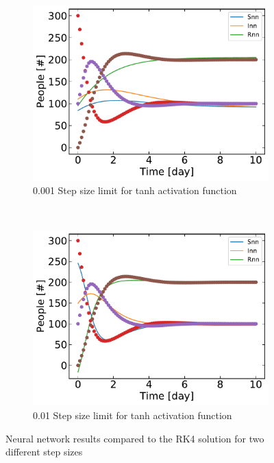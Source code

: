 	 \begin{figure}[H]
	     \centering
	     \begin{subfigure}{0.5\textwidth}
	         \centering
	         \includegraphics[width=\linewidth]{result/Resultater_supervised/tanh_1000_100_001.pdf}
	         \caption{0.001 Step size limit for tanh activation function}
	     \end{subfigure}%
	     ~ 
	     \begin{subfigure}{0.5\textwidth}
	         \centering
	         \includegraphics[width=\linewidth]{result/Resultater_supervised/tanh_1000_100_01.pdf}
	         \caption{0.01 Step size limit for tanh activation function}
	     \end{subfigure}
	     \caption{Neural network results compared to the RK4 solution for two different step sizes}
	     \label{fig:step size}
	 \end{figure}
